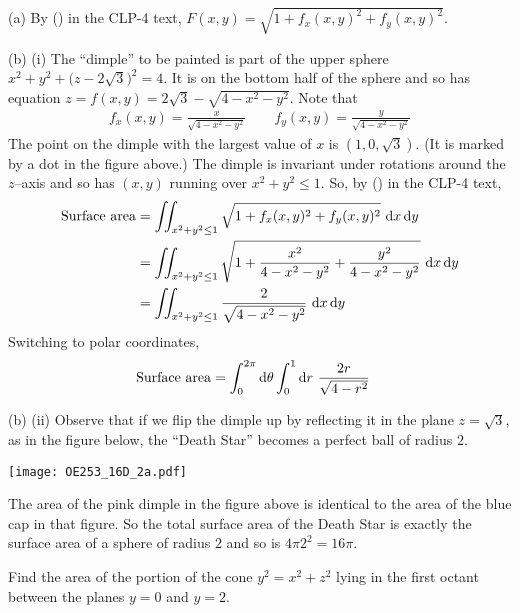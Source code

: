 \begin{solution}
(a)
By () in the CLP-4 text,
$F(x,y) = \sqrt{1+f_x(x,y)^2+f_y(x,y)^2}$.

(b)  (i) The ``dimple'' to be painted is part of the upper sphere
$x^2+y^2+\big(z-2\sqrt{3}\big)^2=4$. It is on the bottom half of the sphere
and so has equation $z=f(x,y)=2\sqrt{3}-\sqrt{4-x^2-y^2}$. Note that
\begin{align*}
f_x(x,y) = \frac{x}{\sqrt{4-x^2-y^2}}\qquad
f_y(x,y) = \frac{y}{\sqrt{4-x^2-y^2}}
\end{align*}
The point on the dimple with the largest value of $x$ is
$(1,0,\sqrt{3})$. (It is marked by a dot in the figure above.) The dimple
is invariant under rotations around the $z$--axis and so has $(x,y)$
running over $x^2+y^2\le 1$. So, by 
() in the CLP-4 text,
\begin{align*}
\text{Surface area}
&= \dblInt_{x^2+y^2\le 1}\sqrt{1+f_x(x,y)^2+f_y(x,y)^2}\ \dee{x}\,\dee{y} \\
&= \dblInt_{x^2+y^2\le 1}\sqrt{1+\frac{x^2}{4-x^2-y^2}
                                +\frac{y^2}{4-x^2-y^2}}\ \dee{x}\,\dee{y} \\
&= \dblInt_{x^2+y^2\le 1}\frac{2}{\sqrt{4-x^2-y^2}}\ \dee{x}\,\dee{y} 
\end{align*}
Switching to polar coordinates,
\begin{align*}
\text{Surface area}
&= \int_0^{2\pi}\mathrm{d}\theta\int_0^1\mathrm{d}r\ \frac{2r}{\sqrt{4-r^2}}
\end{align*}

(b) (ii) Observe that if we flip the dimple up by reflecting it
in the plane $z=\sqrt{3}$, as in the figure below, the ``Death Star'' 
becomes a perfect ball of radius $2$.  
\begin{center}
     \texttt{[image: OE253\_16D\_2a.pdf]}
\end{center}
The area of the pink dimple in the figure above is identical to the area
of the blue cap in that figure. So the total surface area of the 
Death Star is exactly the surface area of a sphere of radius $2$ and so
is $4\pi 2^2=16\pi$.

\end{solution}

\begin{question}
Find the area of the portion of the cone $y^2 = x^2 + z^2$ 
lying in the first octant between the planes $y = 0$ and $y = 2$.
\end{question}


